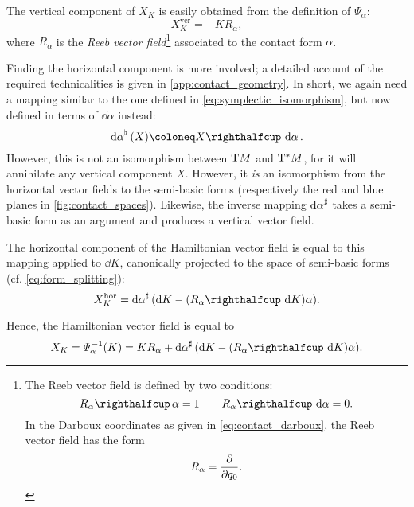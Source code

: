 The vertical component of \(X_K\) is easily obtained from the definition of \(\Psi_\alpha\):
\begin{equation}
    X_K^\text{ver} = -K R_\alpha,
    \label{eq:vertical_vf}
\end{equation}
where \(R_\alpha\) is the \emph{Reeb vector field}\footnote{
    The Reeb vector field is defined by two conditions: \cite{Libermann1987}
        \begin{equation}
     \intpr{R_\alpha}{\alpha} = 1 \qquad \intpr{R_\alpha}{\dd{\alpha}} = 0.
    \end{equation}
    In the Darboux coordinates as given in \cref{eq:contact_darboux}, the Reeb vector field has the form
    \begin{equation}
     R_\alpha = \pdv{}{q_0}.
    \end{equation}
} 
associated to the contact form \(\alpha\).

Finding the horizontal component is more involved; a detailed account of the required technicalities is given in \cref{app:contact_geometry}. In short, we again need a mapping similar to the one defined in \cref{eq:symplectic_isomorphism}, but now defined in terms of \(\dd{\alpha}\) instead:
\begin{equation}
    \toDual{\dd{\alpha}}(X) \coloneq \intpr{X}{\dd{\alpha}}.
    \label{eq:contact_isomorphism}
\end{equation}
However, this is not an isomorphism between \(\mathrm{T}M\) and \(\mathrm{T}^*M\), for it will annihilate any vertical component \(X\). However, it \emph{is} an isomorphism from the horizontal vector fields to the semi-basic forms (respectively the red and blue planes in \cref{fig:contact_spaces}). Likewise, the inverse mapping \(\dd{\alpha}^\sharp\) takes a semi-basic form as an argument and produces a vertical vector field. 

The horizontal component of the Hamiltonian vector field is equal to this mapping applied to \(\dd{K}\), canonically projected to the space of semi-basic forms (cf. \cref{eq:form_splitting}):
\begin{equation}
    X_K^\text{hor} = \fromDual{\dd{\alpha}}\qty(\dd{K} - (\intpr{R_\alpha}{\dd{K}})\alpha).
    \label{eq:horizontal_vf}
\end{equation}

Hence, the Hamiltonian vector field is equal to
\begin{equation}
    X_K = \Psi^{-1}_\alpha(K) = K R_\alpha + \fromDual{\dd{\alpha}}\qty(\dd{K} - (\intpr{R_\alpha}{\dd{K}})\alpha).
    \label{eq:contact_hamiltonian_vf}
\end{equation}

